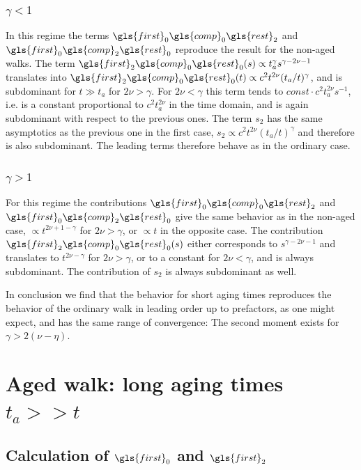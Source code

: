 \subsubsection{$\gamma<1$}
In this regime the terms $\gls{first}_0\gls{comp}_0 \gls{rest}_2 $ and $ \gls{first}_0\gls{comp}_2 \gls{rest}_0$ reproduce the result for the non-aged walks. The term $\gls{first}_2\gls{comp}_0 \gls{rest}_0 (s)  \propto t_a^\gamma s^{\gamma-2\nu -1}$
translates into $\gls{first}_2\gls{comp}_0 \gls{rest}_0 (t) \propto c^2 t^{2\nu}(t_a/t)^\gamma$, and is subdominant for $t \gg t_a$ for $2\nu > \gamma$. For $2\nu < \gamma$ this term tends to $const \cdot  c^2 t_a^{2\nu}s^{-1}$, i.e. is a constant proportional to $c^2 t_a^{2\nu}$ in the time domain, and is again subdominant with respect to the previous ones.
The term $s_2$ has the same asymptotics as the previous one in the first case, $s_2 \propto c^2 t^{2\nu}(t_a/t)^\gamma$ and therefore is also subdominant. The leading terms  therefore behave as in the ordinary case.

\subsubsection{$\gamma>1$}
For this regime the contributions $\gls{first}_0\gls{comp}_0 \gls{rest}_2 $ and $\gls{first}_0\gls{comp}_2 \gls{rest}_0 $ give the same behavior as in the non-aged case, $\propto t^{2\nu +1- \gamma }$ for $2\nu > \gamma$,
or  $\propto t$ in the opposite case. The contribution $\gls{first}_2\gls{comp}_0 \gls{rest}_0 (s)$ either corresponds to $s^{\gamma-2\nu -1}$ and translates to $t^{2\nu - \gamma}$ for $2\nu > \gamma$, or to a constant for $2\nu < \gamma$, and is always subdominant. The contribution of $s_2$ is always subdominant as well. 

In conclusion we find that the behavior for short aging times reproduces the behavior of the ordinary walk in leading order up to prefactors, as one might expect, and has the same range of convergence: The second moment exists for $\gamma > 2(\nu-\eta)$.


\section{Aged walk: long aging times $t_a >> t$ \label{sec:considerably}}

\subsection*{Calculation of $\gls{first}_0$ and $\gls{first}_2$}

